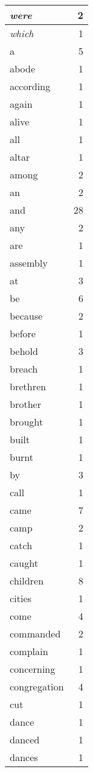 \begin{center}
\begin{longtable}{l|r}
\emph{were} & 2 \\ \hline
\emph{which} & 1 \\ \hline
a & 5 \\ \hline
abode & 1 \\ \hline
according & 1 \\ \hline
again & 1 \\ \hline
alive & 1 \\ \hline
all & 1 \\ \hline
altar & 1 \\ \hline
among & 2 \\ \hline
an & 2 \\ \hline
and & 28 \\ \hline
any & 2 \\ \hline
are & 1 \\ \hline
assembly & 1 \\ \hline
at & 3 \\ \hline
be & 6 \\ \hline
because & 2 \\ \hline
before & 1 \\ \hline
behold & 3 \\ \hline
breach & 1 \\ \hline
brethren & 1 \\ \hline
brother & 1 \\ \hline
brought & 1 \\ \hline
built & 1 \\ \hline
burnt & 1 \\ \hline
by & 3 \\ \hline
call & 1 \\ \hline
came & 7 \\ \hline
camp & 2 \\ \hline
catch & 1 \\ \hline
caught & 1 \\ \hline
children & 8 \\ \hline
cities & 1 \\ \hline
come & 4 \\ \hline
commanded & 2 \\ \hline
complain & 1 \\ \hline
concerning & 1 \\ \hline
congregation & 4 \\ \hline
cut & 1 \\ \hline
dance & 1 \\ \hline
danced & 1 \\ \hline
dances & 1 \\ \hline

\end{longtable}
\end{center}
